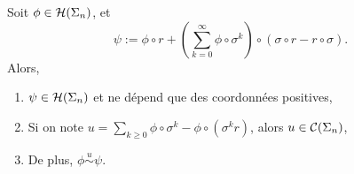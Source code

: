   \begin{lemma}
    \label{lem:fn_equiv_pos_coords}
    \leanok
    Soit $\phi \in \mathcal{H} (\Sigma_{n})$, et
    $$\psi := \phi \circ r + \left(\sum_{k=0}^{\infty}{\phi \circ \sigma^k}\right)\circ(\sigma \circ r - r \circ \sigma).$$
    Alors,
    \begin{enumerate}
      \item $\psi \in \mathcal{H} (\Sigma_{n})$ et ne dépend que des coordonnées positives,
      \item Si on note $u = \sum_{k\geq 0}{\phi\circ\sigma^k - \phi\circ(\sigma^k r)}$, alors $u \in \mathcal{C} (\Sigma_{n})$,
      \item De plus, $\phi \overset{u}{\sim} \psi$.
    \end{enumerate}
  \end{lemma}

